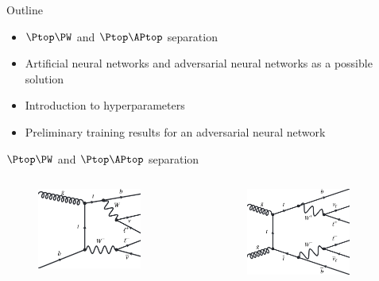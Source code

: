 \documentclass[10pt, UKenglish]{beamer}
\begin{document}
\begin{frame}{Outline}
\begin{itemize}
    \item $\Ptop\PW$ and $\Ptop\APtop$ separation
    \vspace{0.3cm}
    \item Artificial neural networks and adversarial neural networks as a possible solution
    \vspace{0.3cm}
    \item Introduction to hyperparameters
    \vspace{0.3cm}
    \item Preliminary training results for an adversarial neural network
\end{itemize}
\end{frame}

\begin{frame}{$\Ptop\PW$ and $\Ptop\APtop$ separation}
    \begin{columns}
    \begin{column}{0.5\textwidth}
        \begin{figure}
            \centering
            \includegraphics[width = 0.8\textwidth]{tw.png}
        \end{figure}
        \end{column}
        \begin{column}{0.5\textwidth}
        \begin{figure}
            \centering
            \includegraphics[width = 0.8\textwidth]{tt.png}

\end{figure}
\end{column}
\end{columns}
\end{frame}
\end{document}
